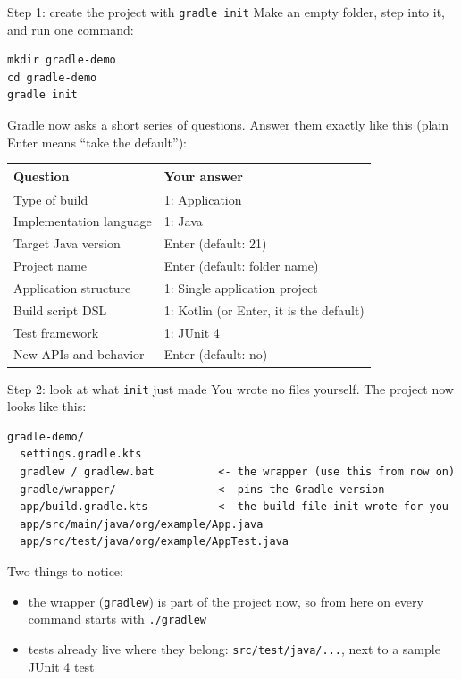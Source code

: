 \documentclass[11pt,aspectratio=169]{beamer}
\begin{document}
\begin{frame}[fragile]{Step 1: create the project with \texttt{gradle init}}
  Make an empty folder, step into it, and run one command:
  \begin{lstlisting}
mkdir gradle-demo
cd gradle-demo
gradle init
  \end{lstlisting}
  Gradle now asks a short series of questions. Answer them exactly like
  this (plain Enter means ``take the default''):
  \begin{center}
  {\scriptsize
  \begin{tabular}{l|l}
    Question & Your answer \\ \hline
    Type of build & 1: Application \\
    Implementation language & 1: Java \\
    Target Java version & Enter (default: 21) \\
    Project name & Enter (default: folder name) \\
    Application structure & 1: Single application project \\
    Build script DSL & 1: Kotlin (or Enter, it is the default) \\
    Test framework & 1: JUnit 4 \\
    New APIs and behavior & Enter (default: no) \\
  \end{tabular}
  }
  \end{center}
\end{frame}

\begin{frame}[fragile]{Step 2: look at what \texttt{init} just made}
  You wrote no files yourself. The project now looks like this:
  \begin{lstlisting}
gradle-demo/
  settings.gradle.kts
  gradlew / gradlew.bat          <- the wrapper (use this from now on)
  gradle/wrapper/                <- pins the Gradle version
  app/build.gradle.kts           <- the build file init wrote for you
  app/src/main/java/org/example/App.java
  app/src/test/java/org/example/AppTest.java
  \end{lstlisting}
  Two things to notice:
  \begin{itemize}
    \item the wrapper (\texttt{gradlew}) is part of the project now, so
      from here on every command starts with \texttt{./gradlew}
    \item tests already live where they belong:
      \texttt{src/test/java/...}, next to a sample JUnit 4 test
  \end{itemize}
\end{frame}
\end{document}
